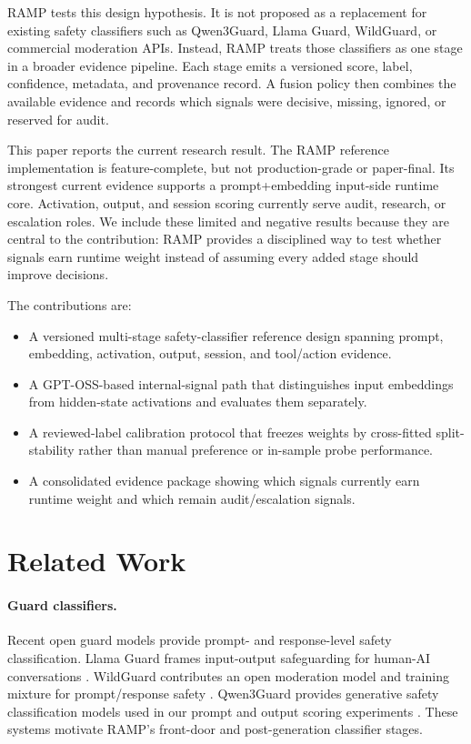 \documentclass[11pt]{article}
\begin{document}
RAMP tests this design hypothesis. It is not proposed as a replacement for existing safety
classifiers such as Qwen3Guard, Llama Guard, WildGuard, or commercial moderation APIs. Instead, RAMP
treats those classifiers as one stage in a broader evidence pipeline. Each stage emits a versioned
score, label, confidence, metadata, and provenance record. A fusion policy then combines the
available evidence and records which signals were decisive, missing, ignored, or reserved for audit.

This paper reports the current research result. The RAMP reference implementation is
feature-complete, but not production-grade or paper-final. Its strongest current evidence supports a
prompt+embedding input-side runtime core. Activation, output, and session scoring currently serve
audit, research, or escalation roles. We include these limited and negative results because they are
central to the contribution: RAMP provides a disciplined way to test whether signals earn runtime
weight instead of assuming every added stage should improve decisions.

The contributions are:
\begin{itemize}[leftmargin=*]
\item A versioned multi-stage safety-classifier reference design spanning prompt, embedding,
activation, output, session, and tool/action evidence.
\item A GPT-OSS-based internal-signal path that distinguishes input embeddings from hidden-state
activations and evaluates them separately.
\item A reviewed-label calibration protocol that freezes weights by cross-fitted split-stability
rather than manual preference or in-sample probe performance.
\item A consolidated evidence package showing which signals currently earn runtime weight and
which remain audit/escalation signals.
\end{itemize}

\section{Related Work}

\paragraph{Guard classifiers.}
Recent open guard models provide prompt- and response-level safety classification. Llama Guard
frames input-output safeguarding for human-AI conversations \citep{llamaguard2023}. WildGuard
contributes an open moderation model and training mixture for prompt/response safety
\citep{wildguard2024}. Qwen3Guard provides generative safety classification models used in our
prompt and output scoring experiments \citep{qwen3guard2025}. These systems motivate RAMP's
front-door and post-generation classifier stages.
\end{document}
